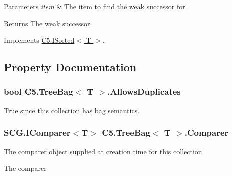 \begin{DoxyParams}{Parameters}
{\em item} & The item to find the weak successor for.\\
\hline
\end{DoxyParams}
\begin{DoxyReturn}{Returns}
The weak successor.
\end{DoxyReturn}


Implements \hyperlink{interface_c5_1_1_i_sorted_a52c5bf3983dfb2378ec431206d1ee8ce}{C5.\+I\+Sorted$<$ T $>$}.



\subsection{Property Documentation}
\hypertarget{class_c5_1_1_tree_bag_accec3077233cff8a029dc3b4acc4dcd6}{}
\subsubsection[{Allows\+Duplicates}]{\setlength{\rightskip}{0pt plus 5cm}bool {\bf C5.\+Tree\+Bag}$<$ T $>$.Allows\+Duplicates\hspace{0.3cm}{\ttfamily [get]}}\label{class_c5_1_1_tree_bag_accec3077233cff8a029dc3b4acc4dcd6}




True since this collection has bag semantics.\hypertarget{class_c5_1_1_tree_bag_ab679605413db459d72a16048bbe1a53d}{}
\subsubsection[{Comparer}]{\setlength{\rightskip}{0pt plus 5cm}S\+C\+G.\+I\+Comparer$<$T$>$ {\bf C5.\+Tree\+Bag}$<$ T $>$.Comparer\hspace{0.3cm}{\ttfamily [get]}}\label{class_c5_1_1_tree_bag_ab679605413db459d72a16048bbe1a53d}


The comparer object supplied at creation time for this collection 

The comparer\hypertarget{class_c5_1_1_tree_bag_abb9302b90eec04c6eaca70c7cfeed117}{}
